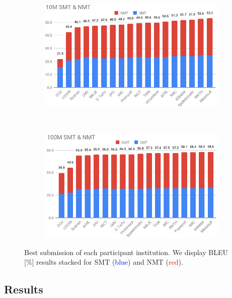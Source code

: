 \begin{figure}[ht]
  \centering
  \begin{subfigure}[b]{\columnwidth}
    \hspace*{-1.5em}
    \includegraphics[width=1.1\textwidth]{images/10M_crop.png}
    \label{fig:10M}
  \end{subfigure}
  ~
  \begin{subfigure}[b]{\columnwidth}
    \hspace*{-1.5em}
    \includegraphics[width=1.1\textwidth]{images/100M_crop.png}
    \label{fig:100M}
  \end{subfigure}
  \caption{Best submission of each participant institution. We display BLEU [\%] results stacked for SMT (\textcolor{blue}{blue}) and NMT (\textcolor{red}{red}).}
  \label{fig:results}
\end{figure}

\subsection{Results}

